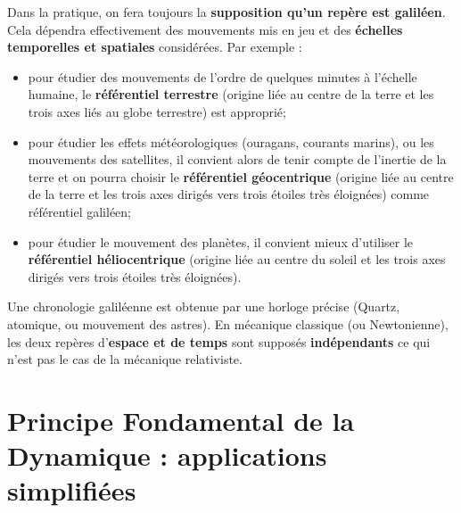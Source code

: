 \documentclass[10pt,fleqn]{article} %
\begin{document}
\begin{rem}
Dans la pratique, on fera toujours la \textbf{supposition qu'un repère est galiléen}. Cela dépendra effectivement des mouvements mis en jeu et des \textbf{échelles temporelles et spatiales} considérées. 
Par exemple :
\begin{itemize}
\item pour étudier des mouvements de l'ordre de quelques minutes à l'échelle humaine, le \textbf{référentiel terrestre} (origine liée au centre de la terre et les trois axes liés au globe terrestre) est approprié;
\item pour étudier les effets météorologiques (ouragans, courants marins), ou les mouvements des satellites, il convient alors de tenir compte de l'inertie de la terre et on pourra choisir le \textbf{référentiel géocentrique} (origine liée au centre de la terre et les trois axes dirigés vers trois étoiles très éloignées) comme référentiel galiléen;
\item pour étudier le mouvement des planètes, il convient mieux d'utiliser le \textbf{référentiel héliocentrique} (origine liée au centre du soleil et les trois axes dirigés vers trois étoiles très éloignées).
\end{itemize}

Une chronologie galiléenne est obtenue par une horloge précise (Quartz, atomique, ou mouvement des astres).
En mécanique classique (ou Newtonienne), les deux repères d'\textbf{espace et de temps} sont supposés \textbf{indépendants} ce qui n'est pas le cas de la mécanique relativiste. 
\end{rem}




\section[PFD : applications simplifiées]{Principe Fondamental de la Dynamique : applications simplifiées}

\end{document}
